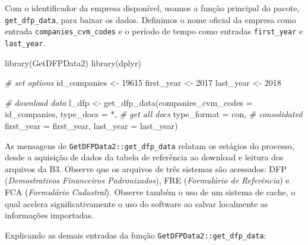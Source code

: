 \documentclass[
  11pt,
]{book}
\newenvironment{Shaded}{\begin{snugshade}}{\end{snugshade}}
\newcommand{\AttributeTok}[1]{\textcolor[rgb]{0.61,0.61,0.61}{#1}}
\newcommand{\CommentTok}[1]{\textcolor[rgb]{0.37,0.37,0.37}{\textit{#1}}}
\newcommand{\DecValTok}[1]{\textcolor[rgb]{0.06,0.06,0.06}{#1}}
\newcommand{\FunctionTok}[1]{\textcolor[rgb]{0,0,0}{#1}}
\newcommand{\NormalTok}[1]{#1}
\newcommand{\OtherTok}[1]{\textcolor[rgb]{0.37,0.37,0.37}{#1}}
\newcommand{\StringTok}[1]{\textcolor[rgb]{0.5,0.5,0.5}{#1}}
\begin{document}
Com o identificador da empresa disponível, usamos a função principal do pacote, \texttt{get\_dfp\_data}, para baixar os dados. Definimos o nome oficial da empresa como entrada \texttt{companies\_cvm\_codes} e o período de tempo como entradas \texttt{first\_year} e \texttt{last\_year}.


\begin{Shaded}
\begin{Highlighting}[]
\FunctionTok{library}\NormalTok{(GetDFPData2)}
\FunctionTok{library}\NormalTok{(dplyr)}

\CommentTok{\# set options}
\NormalTok{id\_companies }\OtherTok{\textless{}{-}} \DecValTok{19615}
\NormalTok{first\_year }\OtherTok{\textless{}{-}} \DecValTok{2017}
\NormalTok{last\_year  }\OtherTok{\textless{}{-}} \DecValTok{2018}

\CommentTok{\# download data}
\NormalTok{l\_dfp }\OtherTok{\textless{}{-}} \FunctionTok{get\_dfp\_data}\NormalTok{(}\AttributeTok{companies\_cvm\_codes =}\NormalTok{ id\_companies,}
                      \AttributeTok{type\_docs =} \StringTok{\textquotesingle{}*\textquotesingle{}}\NormalTok{, }\CommentTok{\# get all docs  }
                      \AttributeTok{type\_format =} \StringTok{\textquotesingle{}con\textquotesingle{}}\NormalTok{, }\CommentTok{\# consolidated}
                      \AttributeTok{first\_year =}\NormalTok{ first\_year,}
                      \AttributeTok{last\_year =}\NormalTok{ last\_year)}
\end{Highlighting}
\end{Shaded}

As mensagens de \texttt{GetDFPData2::get\_dfp\_data} relatam os estágios do processo, desde a aquisição de dados da tabela de referência ao download e leitura dos arquivos da B3. Observe que os arquivos de três sistemas são acessados: DFP (\emph{Demostrativos Financeiros Padronizados}), FRE (\emph{Formulário de Referência}) e FCA (\emph{Formulário Cadastral}). Observe também o uso de um sistema de cache, o qual acelera significativamente o uso do software ao salvar localmente as informações importadas.

Explicando as demais entradas da função \texttt{GetDFPData2::get\_dfp\_data}:
\end{document}
